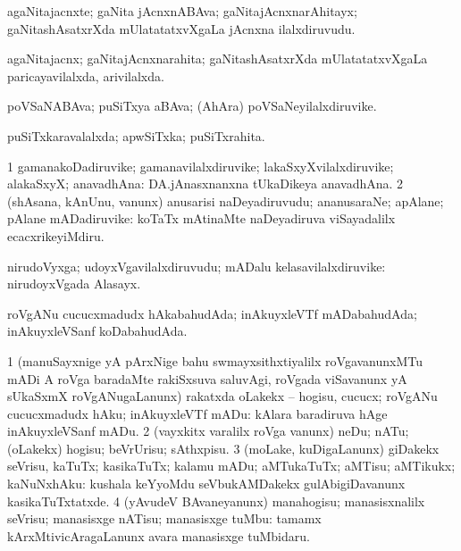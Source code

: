 \bentry
{}
\gl{\nA}
\bmng
agaNitajacnxte; gaNita jAcnxnABAva; gaNitajAcnxnarAhitayx; gaNitashAsatxrXda mUlatatatxvXgaLa jAcnxna ilalxdiruvudu. 
\emng
\eentry

\bentry
{}
\gl{\gu}
\bmng
agaNitajacnx; gaNitajAcnxnarahita; gaNitashAsatxrXda mUlatatatxvXgaLa paricayavilalxda, arivilalxda. 
\emng
\eentry

\bentry
{}
\gl{\nA}
\bmng
poVSaNABAva; puSiTxya aBAva; (AhAra) poVSaNeyilalxdiruvike. 
\emng
\eentry

\bentry
{}
\gl{\gu}
\bmng
puSiTxkaravalalxda; apwSiTxka; puSiTxrahita. 
\emng
\eentry

\bentry
{}
\gl{\nA}
\bmng
\bnum
\num{1} gamanakoDadiruvike; gamanavilalxdiruvike; lakaSxyXvilalxdiruvike; alakaSxyX; anavadhAna:  DA.jAnasxnanxna tUkaDikeya anavadhAna. 
\num{2} (shAsana, kAnUnu, \mo vanunx) anusarisi naDeyadiruvudu; ananusaraNe; apAlane; pAlane mADadiruvike:  koTaTx mAtinaMte naDeyadiruva viSayadalilx ecacxrikeyiMdiru. 
\enum
\emng
\eentry

\bentry
{}
\gl{\nA}
\bmng
nirudoVyxga; udoyxVgavilalxdiruvudu; mADalu kelasavilalxdiruvike:  nirudoyxVgada Alasayx. 
\emng
\eentry

\bentry
{}
\gl{\gu}
\bmng
roVgANu cucucxmadudx hAkabahudAda; inAkuyxleVTf mADabahudAda; inAkuyxleVSanf koDabahudAda. 
\emng
\eentry

\bentry
{}
\gl{\sakirx}
\bmng
\bnum
\num{1} (manuSayxnige yA pArxNige bahu swmayxsithxtiyalilx roVgavanunxMTu mADi A roVga baradaMte rakiSxsuva saluvAgi, roVgada viSavanunx yA sUkaSxmX roVgANugaLanunx) rakatxda oLakekx -- hogisu, cucucx; roVgANu cucucxmadudx hAku; inAkuyxleVTf mADu:  kAlara baradiruva hAge inAkuyxleVSanf mADu. 
\num{2} (vayxkitx \mo varalilx roVga \mo vanunx) neDu; nATu; (oLakekx) hogisu; beVrUrisu; sAthxpisu. 
\num{3} (moLake, kuDigaLanunx) giDakekx seVrisu, kaTuTx; kasikaTuTx; kalamu mADu; aMTukaTuTx; aMTisu; aMTikukx; kaNuNxhAku:  kushala keYyoMdu seVbukAMDakekx gulAbigiDavanunx kasikaTuTxtatxde. 
\num{4} (yAvudeV BAvaneyanunx) manahogisu; manasisxnalilx seVrisu; manasisxge nATisu; manasisxge tuMbu:  tamamx kArxMtivicAragaLanunx avara manasisxge tuMbidaru. 
\enum
\emng
\eentry


